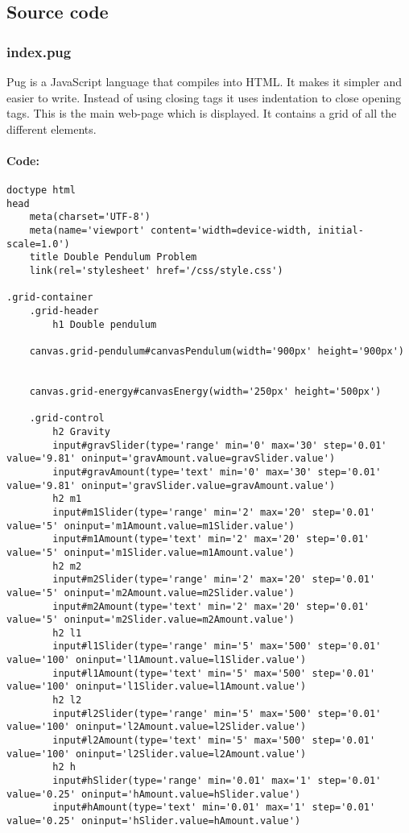 \documentclass[12pt]{article}
\begin{document}
\subsection{Source code}
\subsubsection{index.pug}
Pug is a JavaScript language that compiles into HTML. It makes it simpler and easier to write. Instead of using closing tags it uses indentation to close opening tags. This is the main web-page which is displayed. It contains a grid of all the different elements. 
\paragraph{Code:}
\begin{lstlisting}[language=pug]
doctype html
head
    meta(charset='UTF-8')
    meta(name='viewport' content='width=device-width, initial-scale=1.0')
    title Double Pendulum Problem
    link(rel='stylesheet' href='/css/style.css')

.grid-container 
    .grid-header
        h1 Double pendulum

    canvas.grid-pendulum#canvasPendulum(width='900px' height='900px')


    canvas.grid-energy#canvasEnergy(width='250px' height='500px')

    .grid-control
        h2 Gravity
        input#gravSlider(type='range' min='0' max='30' step='0.01' value='9.81' oninput='gravAmount.value=gravSlider.value')
        input#gravAmount(type='text' min='0' max='30' step='0.01' value='9.81' oninput='gravSlider.value=gravAmount.value')
        h2 m1
        input#m1Slider(type='range' min='2' max='20' step='0.01' value='5' oninput='m1Amount.value=m1Slider.value')
        input#m1Amount(type='text' min='2' max='20' step='0.01' value='5' oninput='m1Slider.value=m1Amount.value')
        h2 m2
        input#m2Slider(type='range' min='2' max='20' step='0.01' value='5' oninput='m2Amount.value=m2Slider.value')
        input#m2Amount(type='text' min='2' max='20' step='0.01' value='5' oninput='m2Slider.value=m2Amount.value')
        h2 l1
        input#l1Slider(type='range' min='5' max='500' step='0.01' value='100' oninput='l1Amount.value=l1Slider.value')
        input#l1Amount(type='text' min='5' max='500' step='0.01' value='100' oninput='l1Slider.value=l1Amount.value')
        h2 l2
        input#l2Slider(type='range' min='5' max='500' step='0.01' value='100' oninput='l2Amount.value=l2Slider.value')
        input#l2Amount(type='text' min='5' max='500' step='0.01' value='100' oninput='l2Slider.value=l2Amount.value')
        h2 h
        input#hSlider(type='range' min='0.01' max='1' step='0.01' value='0.25' oninput='hAmount.value=hSlider.value')
        input#hAmount(type='text' min='0.01' max='1' step='0.01' value='0.25' oninput='hSlider.value=hAmount.value')
        

\end{lstlisting}
\end{document}
